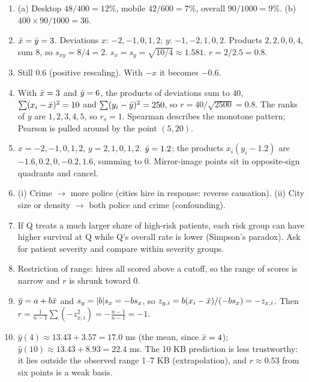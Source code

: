 \begin{enumerate}
  \item (a) Desktop $48/400 = 12\%$, mobile $42/600 = 7\%$, overall $90/1000 = 9\%$.
    (b) $400 \times 90/1000 = 36$.
  \item $\bar{x} = \bar{y} = 3$. Deviations $x$: $-2,-1,0,1,2$; $y$: $-1,-2,1,0,2$.
    Products $2,2,0,0,4$, sum $8$, so $s_{xy} = 8/4 = 2$. $s_x = s_y = \sqrt{10/4}
    \approx 1.581$. $r = 2/2.5 = 0.8$.
  \item Still $0.6$ (positive rescaling). With $-x$ it becomes $-0.6$.
  \item With $\bar{x} = 3$ and $\bar{y} = 6$, the products of deviations sum to $40$,
    $\sum(x_i-\bar{x})^2 = 10$ and $\sum(y_i-\bar{y})^2 = 250$, so
    $r = 40/\sqrt{2500} = 0.8$. The ranks of $y$ are $1,2,3,4,5$, so $r_s = 1$. Spearman
    describes the monotone pattern; Pearson is pulled around by the point $(5,20)$.
  \item $x = -2,-1,0,1,2$, $y = 2,1,0,1,2$. $\bar{y} = 1.2$; the products
    $x_i(y_i - 1.2)$ are $-1.6, 0.2, 0, -0.2, 1.6$, summing to $0$. Mirror-image
    points sit in opposite-sign quadrants and cancel.
  \item (i) Crime $\to$ more police (cities hire in response: reverse causation).
    (ii) City size or density $\to$ both police and crime (confounding).
  \item If Q treats a much larger share of high-risk patients, each risk group can
    have higher survival at Q while Q's overall rate is lower (Simpson's paradox).
    Ask for patient severity and compare within severity groups.
  \item Restriction of range: hires all scored above a cutoff, so the range of scores
    is narrow and $r$ is shrunk toward 0.
  \item $\bar{y} = a + b\bar{x}$ and $s_y = \lvert b\rvert s_x = -b s_x$, so
    $z_{y,i} = b(x_i-\bar{x})/(-b s_x) = -z_{x,i}$. Then
    $r = \frac{1}{n-1}\sum (-z_{x,i}^2) = -\frac{n-1}{n-1} = -1$.
  \item $\hat y(4) \approx 13.43 + 3.57 = 17.0$ ms (the mean, since $\bar{x} = 4$);
    $\hat y(10) \approx 13.43 + 8.93 = 22.4$ ms. The 10 KB prediction is less
    trustworthy: it lies outside the observed range 1--7 KB (extrapolation), and
    $r \approx 0.53$ from six points is a weak basis.
\end{enumerate}

